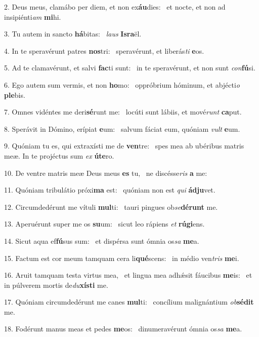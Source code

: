 2. Deus meus, clamábo per diem, et non ex\textbf{áu}dies: \ast\  et nocte, et non ad insipiénti\textit{am} \textbf{mi}hi.\

3. Tu autem in sancto \textbf{há}bitas: \ast\  \textit{laus} \textbf{Is}\textbf{ra}ël.\

4. In te speravérunt patres \textbf{nos}tri: \ast\  speravérunt, et liberás\textit{ti} \textbf{e}os.\

5. Ad te clamavérunt, et salvi \textbf{fac}ti sunt: \ast\  in te speravérunt, et non sunt \textit{con}\textbf{fú}si.\

6. Ego autem sum vermis, et non \textbf{ho}mo: \ast\  oppróbrium hóminum, et abjécti\textit{o} \textbf{ple}bis.\

7. Omnes vidéntes me deri\textbf{sé}runt me: \ast\  locúti sunt lábiis, et mové\textit{runt} \textbf{ca}put.\

8. Sperávit in Dómino, erípiat \textbf{e}um: \ast\  salvum fáciat eum, quóniam \textit{vult} \textbf{e}um.\

9. Quóniam tu es, qui extraxísti me de \textbf{ven}tre: \ast\  spes mea ab ubéribus matris meæ. In te projéctus sum \textit{ex} \textbf{ú}\textbf{te}ro.\

10. De ventre matris meæ Deus meus \textbf{es} tu, \ast\  ne discésse\textit{ris} \textbf{a} me:\

11. Quóniam tribulátio próxi\textbf{ma} est: \ast\  quóniam non est \textit{qui} \textbf{ád}\textbf{ju}vet.\

12. Circumdedérunt me vítuli \textbf{mul}ti: \ast\  tauri pingues ob\textit{se}\textbf{dé}\textbf{runt} me.\

13. Aperuérunt super me os \textbf{su}um: \ast\  sicut leo rápiens \textit{et} \textbf{rú}\textbf{gi}ens.\

14. Sicut aqua ef\textbf{fú}sus sum: \ast\  et dispérsa sunt ómnia os\textit{sa} \textbf{me}a.\

15. Factum est cor meum tamquam cera li\textbf{qué}scens: \ast\  in médio ven\textit{tris} \textbf{me}i.\

16. Aruit tamquam testa virtus mea, \dag\  et lingua mea adhǽsit fáucibus \textbf{me}is: \ast\  et in púlverem mortis de\textit{du}\textbf{xís}\textbf{ti} me.\

17. Quóniam circumdedérunt me canes \textbf{mul}ti: \ast\  concílium malignántium \textit{ob}\textbf{sé}\textbf{dit} me.\

18. Fodérunt manus meas et pedes \textbf{me}os: \ast\  dinumeravérunt ómnia os\textit{sa} \textbf{me}a.\

